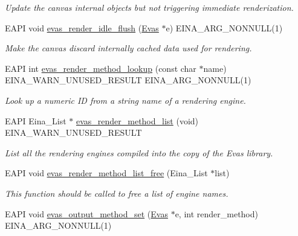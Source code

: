 \begin{DoxyCompactItemize}
\begin{DoxyCompactList}\small\item\em Update the canvas internal objects but not triggering immediate renderization. \item\end{DoxyCompactList}\item 
EAPI void \hyperlink{group__Evas__Canvas_ga84a691e253bf4239691b3f3adca3c7b1}{evas\_\-render\_\-idle\_\-flush} (\hyperlink{group__Evas__Canvas_ga5ff87cc4ce6bc43e3b640a6d37f73043}{Evas} $\ast$e) EINA\_\-ARG\_\-NONNULL(1)
\begin{DoxyCompactList}\small\item\em Make the canvas discard internally cached data used for rendering. \item\end{DoxyCompactList}\item 
EAPI int \hyperlink{group__Evas__Output__Method_gad8a701a8d4a2acbb2ce4b741ae55ce6b}{evas\_\-render\_\-method\_\-lookup} (const char $\ast$name) EINA\_\-WARN\_\-UNUSED\_\-RESULT EINA\_\-ARG\_\-NONNULL(1)
\begin{DoxyCompactList}\small\item\em Look up a numeric ID from a string name of a rendering engine. \item\end{DoxyCompactList}\item 
EAPI Eina\_\-List $\ast$ \hyperlink{group__Evas__Output__Method_ga23d8fc2c859f5dfcc9f50f441b96d285}{evas\_\-render\_\-method\_\-list} (void) EINA\_\-WARN\_\-UNUSED\_\-RESULT
\begin{DoxyCompactList}\small\item\em List all the rendering engines compiled into the copy of the Evas library. \item\end{DoxyCompactList}\item 
EAPI void \hyperlink{group__Evas__Output__Method_gab7f4a90e3082364eca04b39d3c1c2693}{evas\_\-render\_\-method\_\-list\_\-free} (Eina\_\-List $\ast$list)
\begin{DoxyCompactList}\small\item\em This function should be called to free a list of engine names. \item\end{DoxyCompactList}\item 
EAPI void \hyperlink{group__Evas__Output__Method_gab6cca6c7a5edabef057790889d560b11}{evas\_\-output\_\-method\_\-set} (\hyperlink{group__Evas__Canvas_ga5ff87cc4ce6bc43e3b640a6d37f73043}{Evas} $\ast$e, int render\_\-method) EINA\_\-ARG\_\-NONNULL(1)

\end{DoxyCompactItemize}
